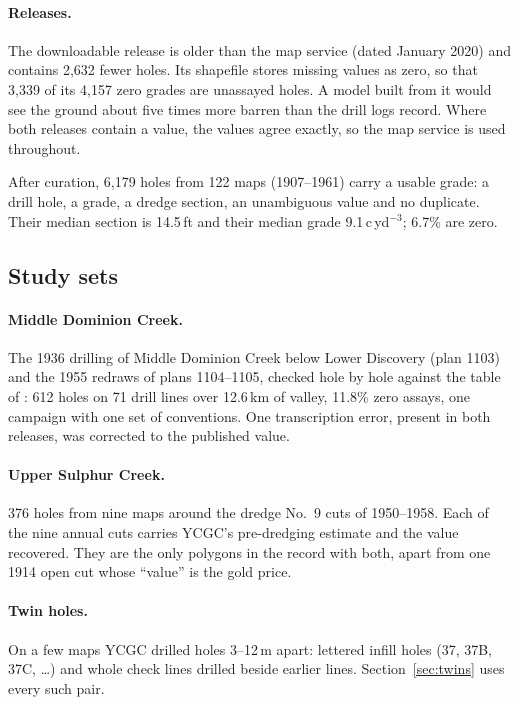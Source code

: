 \documentclass[11pt,a4paper]{article}
\theoremstyle{remark}
\newcommand{\cyd}{c\,yd$^{-3}$}
\begin{document}
\paragraph{Releases.} The downloadable release is older than the map service (dated January 2020) and contains 2,632 fewer holes. Its shapefile stores missing values as zero, so that 3,339 of its 4,157 zero grades are unassayed holes. A model built from it would see the ground about five times more barren than the drill logs record. Where both releases contain a value, the values agree exactly, so the map service is used throughout.

After curation, 6,179 holes from 122 maps (1907--1961) carry a usable grade: a drill hole, a grade, a dredge section, an unambiguous value and no duplicate. Their median section is 14.5\,ft and their median grade 9.1\,\cyd; 6.7\% are zero.

\subsection{Study sets}

\paragraph{Middle Dominion Creek.} The 1936 drilling of Middle Dominion Creek below Lower Discovery (plan 1103) and the 1955 redraws of plans 1104--1105, checked hole by hole against the table of \citet{vanLoon2016}: 612 holes on 71 drill lines over 12.6\,km of valley, 11.8\% zero assays, one campaign with one set of conventions. One transcription error, present in both releases, was corrected to the published value.

\paragraph{Upper Sulphur Creek.} 376 holes from nine maps around the dredge No.~9 cuts of 1950--1958. Each of the nine annual cuts carries YCGC's pre-dredging estimate and the value recovered. They are the only polygons in the record with both, apart from one 1914 open cut whose ``value'' is the gold price.

\paragraph{Twin holes.} On a few maps YCGC drilled holes 3--12\,m apart: lettered infill holes (37, 37B, 37C, \dots) and whole check lines drilled beside earlier lines. Section~\ref{sec:twins} uses every such pair.
\end{document}
